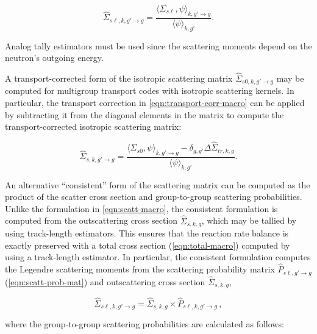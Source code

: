 \begin{equation}
\label{eqn:scatt-macro}
\hat{\Sigma}_{s\ell,k,g'\rightarrow g} = \frac{\langle \Sigma_{s\ell}, \psi \rangle_{k,g'\rightarrow g}}{\langle \psi \rangle_{k,g'}}.
\end{equation}

\noindent Analog tally estimators must be used since the scattering moments depend on the neutron's outgoing energy.

A transport-corrected form of the isotropic scattering matrix $\hat{\Sigma}_{s0,k,g'\rightarrow g}$ may be computed for multigroup transport codes with isotropic scattering kernels. In particular, the transport correction in \cref{eqn:transport-corr-macro} can be applied by subtracting it from the diagonal elements in the matrix to compute the transport-corrected isotropic scattering matrix:

\begin{equation}
\label{eqn:scatt-trans-macro}
\hat{\Sigma}_{s,k,g'\rightarrow g} = \frac{\langle \Sigma_{s0}, \psi \rangle_{k,g'\rightarrow g} - \delta_{g,g'} \Delta\hat{\Sigma}_{tr,k,g}}{\langle \psi \rangle_{k,g'}}.
\end{equation}


An alternative ``consistent'' form of the scattering matrix can be computed as the product of the scatter cross section and group-to-group scattering probabilities. Unlike the formulation in \cref{eqn:scatt-macro}, the consistent formulation is computed from the outscattering cross section $\hat{\Sigma}_{s,k,g}$, which may be tallied by using track-length estimators. This ensures that the reaction rate balance is exactly preserved with a total cross section (\cref{eqn:total-macro}) computed by using a track-length estimator. In particular, the consistent formulation computes the Legendre scattering moments from the scattering probability matrix $\hat{P}_{s\ell,g'\rightarrow g}$ (\cref{eqn:scatt-prob-mat}) and outscattering cross section $\hat{\Sigma}_{s,k,g}$,

\begin{equation}
\label{eqn:scatt-mat-consistent}
\hat{\Sigma}_{s\ell,k,g'\rightarrow g} = \hat{\Sigma}_{s,k,g} \times \hat{P}_{s\ell,k,g'\rightarrow g}\,,
\end{equation}

\noindent where the group-to-group scattering probabilities are calculated as follows:

